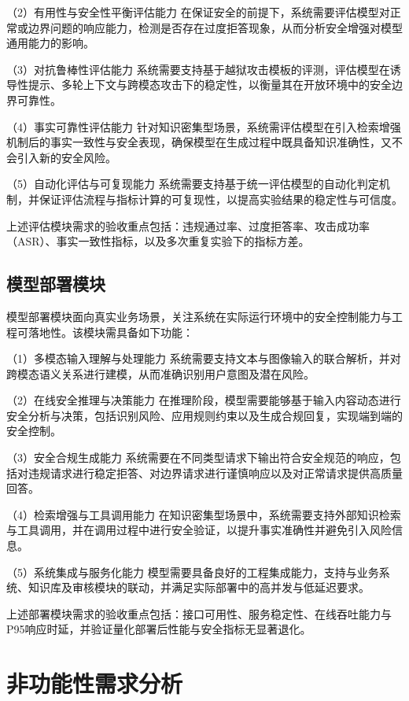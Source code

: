 （2）有用性与安全性平衡评估能力
在保证安全的前提下，系统需要评估模型对正常或边界问题的响应能力，检测是否存在过度拒答现象，从而分析安全增强对模型通用能力的影响。

（3）对抗鲁棒性评估能力
系统需要支持基于越狱攻击模板的评测，评估模型在诱导性提示、多轮上下文与跨模态攻击下的稳定性，以衡量其在开放环境中的安全边界可靠性。

（4）事实可靠性评估能力
针对知识密集型场景，系统需评估模型在引入检索增强机制后的事实一致性与安全表现，确保模型在生成过程中既具备知识准确性，又不会引入新的安全风险。

（5）自动化评估与可复现能力
系统需要支持基于统一评估模型的自动化判定机制，并保证评估流程与指标计算的可复现性，以提高实验结果的稳定性与可信度。

上述评估模块需求的验收重点包括：违规通过率、过度拒答率、攻击成功率（ASR）、事实一致性指标，以及多次重复实验下的指标方差。

\subsection{模型部署模块}
模型部署模块面向真实业务场景，关注系统在实际运行环境中的安全控制能力与工程可落地性。该模块需具备如下功能：

（1）多模态输入理解与处理能力
系统需要支持文本与图像输入的联合解析，并对跨模态语义关系进行建模，从而准确识别用户意图及潜在风险。

（2）在线安全推理与决策能力
在推理阶段，模型需要能够基于输入内容动态进行安全分析与决策，包括识别风险、应用规则约束以及生成合规回复，实现端到端的安全控制。

（3）安全合规生成能力
系统需要在不同类型请求下输出符合安全规范的响应，包括对违规请求进行稳定拒答、对边界请求进行谨慎响应以及对正常请求提供高质量回答。

（4）检索增强与工具调用能力
在知识密集型场景中，系统需要支持外部知识检索与工具调用，并在调用过程中进行安全验证，以提升事实准确性并避免引入风险信息。

（5）系统集成与服务化能力
模型需要具备良好的工程集成能力，支持与业务系统、知识库及审核模块的联动，并满足实际部署中的高并发与低延迟要求。

上述部署模块需求的验收重点包括：接口可用性、服务稳定性、在线吞吐能力与P95响应时延，并验证量化部署后性能与安全指标无显著退化。

\section{非功能性需求分析}

